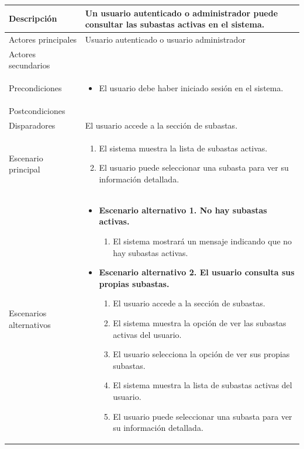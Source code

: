 \begin{longtable}{
    >{\columncolor{lightgreen!20}}p{4cm}
    p{12cm}
    }
    \midrule
    Descripción & Un usuario autenticado o administrador puede consultar las subastas activas en el sistema. \\
    \midrule
    Actores principales & Usuario autenticado o usuario administrador \\
    \midrule
    Actores secundarios &  \\
    \midrule
    Precondiciones & \begin{itemize}[nosep,leftmargin=*]
        \item El usuario debe haber iniciado sesión en el sistema.
    \end{itemize} \\
    \midrule
    Postcondiciones &  \\
    \midrule
    Disparadores & El usuario accede a la sección de subastas. \\
    \midrule
    Escenario principal & \begin{enumerate}[nosep,leftmargin=*]
        \item El sistema muestra la lista de subastas activas.
        \item El usuario puede seleccionar una subasta para ver su información detallada.
    \end{enumerate} \\
    \midrule
    Escenarios alternativos & 
    \begin{itemize}[nosep,leftmargin=*]
        \item \textbf{Escenario alternativo 1. No hay subastas activas.}
        \begin{enumerate}[nosep,leftmargin=*]
            \item El sistema mostrará un mensaje indicando que no hay subastas activas.
        \end{enumerate}
        \item \textbf{Escenario alternativo 2. El usuario consulta sus propias subastas.} 
        \begin{enumerate}[nosep,leftmargin=*]
            \item El usuario accede a la sección de subastas.
            \item El sistema muestra la opción de ver las subastas activas del usuario.
            \item El usuario selecciona la opción de ver sus propias subastas.
            \item El sistema muestra la lista de subastas activas del usuario.
            \item El usuario puede seleccionar una subasta para ver su información detallada.

\end{enumerate}
\end{itemize}
\end{longtable}
